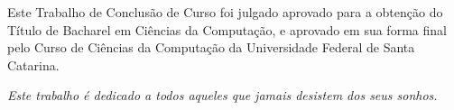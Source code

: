 \documentclass[
    12pt,       %
    openright,      %
    twoside,      %
    a4paper,      %
    english,      %
    french,       %
    spanish,      %
    brazil,       %
    ]{abntex2}
\begin{document}
  \begin{folhadeaprovacao}

    \begin{center}
      {\ABNTEXchapterfont\large\imprimirautor}

      \vspace*{\fill}\vspace*{\fill}
      {\ABNTEXchapterfont\bfseries\Large\imprimirtitulo}
      \vspace*{\fill}


      \vspace*{\fill}
     \end{center}

     Este Trabalho de Conclusão de Curso foi julgado aprovado para a
     obtenção do Título de Bacharel em Ciências da Computação, e
     aprovado em sua forma final pelo Curso de Ciências da Computação
     da Universidade Federal de Santa Catarina.


     \begin{center}
      \vspace*{0.5cm}
      {\large\imprimirlocal}
      \par
      {\large\imprimirdata}
      \vspace*{1cm}
    \end{center}

  \end{folhadeaprovacao}

  \begin{dedicatoria}
     \vspace*{\fill}
     \centering
     \noindent
     \textit{ Este trabalho é dedicado a todos aqueles que jamais desistem dos seus sonhos.} \vspace*{\fill}
  \end{dedicatoria}
\end{document}
